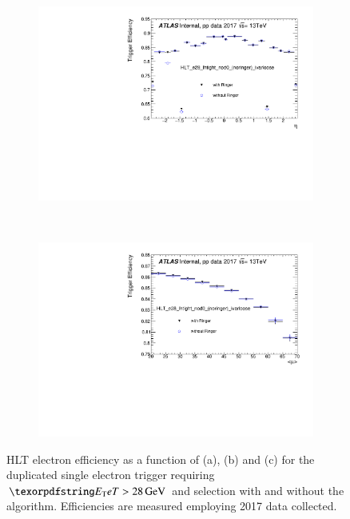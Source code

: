 \begin{figure}[h!tb]
\begin{center}
\begin{subfigure}[c]{.59\textwidth}
  \end{subfigure} \\
  \begin{subfigure}[c]{.59\textwidth}
  \centering
  \includegraphics[width=\textwidth]{sections/04_operation/figures/efficiencies/eff_EGAM1_e28_ringer_and_noringer_2017_after_ts1_HLT_eta.pdf}
  \caption{}%
  \end{subfigure} \\
  \begin{subfigure}[c]{.59\textwidth}
  \centering
  \includegraphics[width=\textwidth]{sections/04_operation/figures/efficiencies/eff_EGAM1_e28_ringer_and_noringer_2017_after_ts1_HLT_mu.pdf}
  \caption{}%
  \label{fig:e28_comp_mu}
  \end{subfigure}
  \caption{\label{fig:e28_triggers}HLT electron efficiency as a function of \et{}
    (a), \eta{} (b) and \avgmu{} (c) for the duplicated single electron trigger
    requiring $\et{} > \SI{28}{\GeV}$ and \tight{} selection with and without the
    \rnn{} algorithm. Efficiencies are measured employing 2017 data collected.}
  \end{center}
\end{figure}
  
